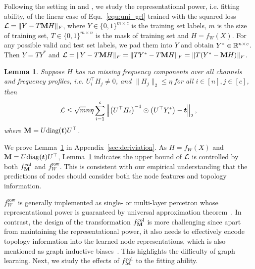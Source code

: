 \documentclass{article} %
\newtheorem{lemma}{\textbf{Lemma}}
\begin{document}

Following the setting in \citet{xu2021optimization} and \citet{JacobiConv}, we study the representational power, i.e. fitting ability, of the linear case of Equ.~\ref{equ:uni_grl} trained with the squared loss ${\mathcal{L}}=\|Y-T{\mathbf{M}} H\|_F$, where $Y\in\{0,1\}^{m\times c}$ is the training set labels, $m$ is the size of training set, $T\in\{0,1\}^{m\times n}$ is the mask of training set and $H=f_W(X)$.
For any possible valid and test set labels, we pad them into $Y$ and obtain $Y^*\in{\mathbb{R}}^{n\times c}$. Then $Y=TY^*$ and ${\mathcal{L}}=\|Y-T{\mathbf{M}} H\|_F=\|TY^*-T{\mathbf{M}} H\|_F=\|T(Y^*-{\mathbf{M}} H)\|_F$.
\begin{lemma}
	\label{prop:loss_bound}
	Suppose $H$ has no missing frequency components over all channels and frequency profiles, i.e. $U_i^{\top}H_j\neq 0$, and $\|H_j\|_2\leq\eta$ for all $i\in[n],j\in[c]$, then
	\begin{equation}
		\label{equ:bound}
		\begin{aligned}
			{\mathcal{L}}\leq\sqrt{m}n\eta\sum_{i=1}^c\left\|\left(U^{\top}H_i\right)^{-1}\odot\left(U^{\top}Y^*_i\right)-{\bm{t}}\right\|_2,
		\end{aligned}
	\end{equation}
	where ${\mathbf{M}}=U\mathrm{diag}({\bm{t}})U^{\top}$.
\end{lemma}
We prove Lemma~\ref{prop:loss_bound} in Appendix~\ref{sec:deriviation}.
As $H=f_W(X)$ and ${\mathbf{M}}=U\mathrm{diag}({\bm{t}})U^{\top}$, Lemma~\ref{prop:loss_bound} indicates the upper bound of ${\mathcal{L}}$ is controlled by both $f_{{\mathbf{M}}}^{\mathrm{col}}$ and $f_W^{\mathrm{row}}$.
This is consistent with our empirical understanding that the predictions of nodes should consider both the node features and topology information.

$f_W^{\mathrm{row}}$ is generally implemented as single- or multi-layer percetron whose representational power is guaranteed by universal approximation theorem~\citep{hornik1989multilayer,cybenko1989approximation}.
In contrast, the design of the transformation $f_{{\mathbf{M}}}^{\mathrm{col}}$ is more challenging since apart from maintaining the representational power, it also needs to effectively encode topology information into the learned node representations, which is also mentioned as graph inductive biases~\citep{ma2023graph}.
This highlights the difficulty of graph learning.
Next, we study the effects of $f_{{\mathbf{M}}}^{\mathrm{col}}$ to the fitting ability.
\end{document}
